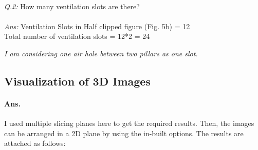 \documentclass[a4paper,11pt]{article}
\theoremstyle{mytheor}
\begin{document}
\textit{\\ Q.2:} How many ventilation slots are there?  \\ \\ 
\textit{Ans:} Ventilation Slots in Half clipped figure (Fig. 5b) = 12 \\
Total number of ventilation slots = 12*2 = 24

\textit{I am considering one air hole between two pillars as one slot.}

\clearpage
\subsection{Visualization of 3D Images}
\paragraph{Ans. } I used multiple slicing planes here to get the required results. Then, the images can be arranged in a 2D plane by using the in-built options. The results are attached as follows:
\end{document}
